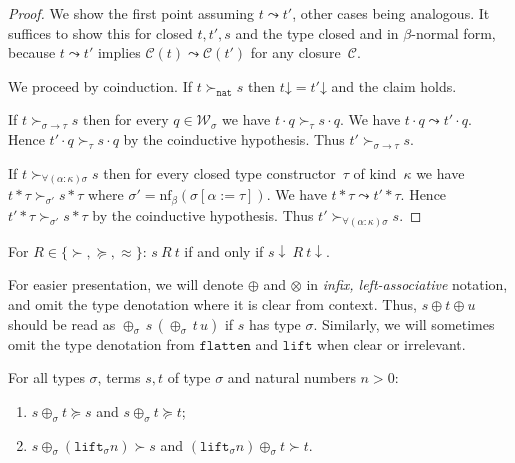 \documentclass[runningheads,a4paper]{llncs}
\newcommand{\World}{\mathcal{W}}
\newcommand{\cl}{\mathcal{C}}
\newcommand{\nf}{\mathrm{nf}}
\newcommand{\arrtype}{\rightarrow}
\newcommand{\app}[2]{#1 \cdot #2}
\newcommand{\tapp}[2]{#1 * #2}
\newcommand{\subst}[2]{#1:=#2}
\newcommand{\nat}{\mathtt{nat}}
\newcommand{\flatten}{\mathtt{flatten}}
\newcommand{\lift}{\mathtt{lift}}
\newcommand{\da}{\mathord{\downarrow}}
\begin{document}
\begin{proof}
  We show the first point assuming $t \leadsto t'$, other cases being
  analogous. It suffices to show this for closed $t,t',s$ and the type
  closed and in $\beta$-normal form, because $t \leadsto t'$ implies
  $\cl(t) \leadsto \cl(t')$ for any closure~$\cl$.

  We proceed by coinduction. If $t \succ_\nat s$ then $t\da = t'\da$
  and the claim holds.

  If $t \succ_{\sigma\arrtype\tau} s$ then for every $q \in
  \World_\sigma$ we have $\app{t}{q} \succ_\tau \app{s}{q}$. We have
  $\app{t}{q} \leadsto \app{t'}{q}$. Hence $\app{t'}{q} \succ_\tau
  \app{s}{q}$ by the coinductive hypothesis. Thus $t'
  \succ_{\sigma\arrtype\tau} s$.

  If $t \succ_{\forall(\alpha:\kappa)\sigma} s$ then for every closed
  type constructor~$\tau$ of kind~$\kappa$ we have $\tapp{t}{\tau}
  \succ_{\sigma'} \tapp{s}{\tau}$ where $\sigma' =
  \nf_\beta(\sigma[\subst{\alpha}{\tau}])$. We have $\tapp{t}{\tau}
  \leadsto \tapp{t'}{\tau}$. Hence $\tapp{t'}{\tau} \succ_{\sigma'}
  \tapp{s}{\tau}$ by the coinductive hypothesis. Thus $t'
  \succ_{\forall(\alpha:\kappa)\sigma} s$.
\end{proof}

\begin{corollary}\label{cor_succ_da}
  For $R \in \{\succ,\succeq,\approx\}$: $s\ R\ t$ if and only if
  $s\downarrow\ R\ t\downarrow$.
\end{corollary}

For easier presentation, we will denote $\oplus$ and $\otimes$ in
\emph{infix, left-associative} notation, and omit the type denotation
where it is clear from context. Thus, $s \oplus t \oplus u$ should be
read as $\oplus_\sigma\,s\,(\oplus_\sigma\,t\,u)$ if $s$ has type
$\sigma$. Similarly, we will sometimes omit the type denotation from
$\flatten$ and $\lift$ when clear or irrelevant.

\begin{lemma}\label{lem:plusparts}
For all types $\sigma$, terms $s,t$ of type $\sigma$ and natural
numbers $n > 0$:
\begin{enumerate}
\item $s \oplus_{\sigma} t \succeq s$ and $s \oplus_{\sigma} t \succeq
  t$;
\item $s \oplus_{\sigma} (\lift_{\sigma} n) \succ s$ and
  $(\lift_{\sigma} n) \oplus_{\sigma} t \succ t$.
\end{enumerate}
\end{lemma}
\end{document}
